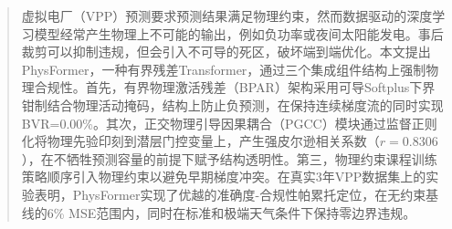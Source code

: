 \begin{abstract}
	虚拟电厂（VPP）预测要求预测结果满足物理约束，然而数据驱动的深度学习模型经常产生物理上不可能的输出，例如负功率或夜间太阳能发电。事后裁剪可以抑制违规，但会引入不可导的死区，破坏端到端优化。本文提出PhysFormer，一种有界残差Transformer，通过三个集成组件结构上强制物理合规性。首先，有界物理激活残差（BPAR）架构采用可导Softplus下界钳制结合物理活动掩码，结构上防止负预测，在保持连续梯度流的同时实现BVR=0.00\%。其次，正交物理引导因果耦合（PGCC）模块通过监督正则化将物理先验印刻到潜层门控变量上，产生强皮尔逊相关系数（$r=0.8306$），在不牺牲预测容量的前提下赋予结构透明性。第三，物理约束课程训练策略顺序引入物理约束以避免早期梯度冲突。在真实3年VPP数据集上的实验表明，PhysFormer实现了优越的准确度-合规性帕累托定位，在无约束基线的6\% MSE范围内，同时在标准和极端天气条件下保持零边界违规。
\end{abstract}
